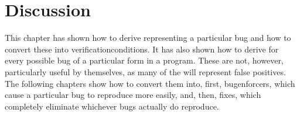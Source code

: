 \section{Discussion}

This chapter has shown how to derive {\StateMachines} representing a
particular bug and how to convert these into
\glspl{verificationcondition}.  It has also shown how to derive
      {\StateMachines} for every possible bug of a particular form in
      a program.  These are not, however, particularly useful by
      themselves, as many of the {\StateMachines} will represent false
      positives.  The following chapters show how to convert them
      into, first, \glspl{bugenforcer}, which cause a particular bug
      to reproduce more easily, and, then, fixes, which completely
      eliminate whichever bugs actually do reproduce.
